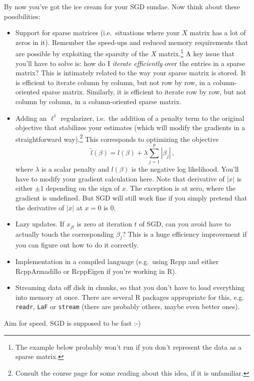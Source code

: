 \documentclass{mynotes}
\begin{document}
By now you've got the ice cream for your SGD sundae.  Now think about these possibilities:
\begin{itemize}
\item Support for sparse matrices (i.e.~situations where your $X$ matrix has a lot of zeros in it).  Remember the speed-ups and reduced memory requirements that are possible by exploiting the sparsity of the $X$ matrix.\footnote{The example below probably won't run if you don't represent the data as a sparse matrix. }  A key issue that you'll have to solve is: how do I \emph{iterate efficiently} over the entries in a sparse matrix?  This is intimately related to the way your sparse matrix is stored.  It is efficient to iterate column by column, but not row by row, in a column-oriented sparse matrix.  Similarly, it is efficient to iterate row by row, but not column by column, in a column-oriented sparse matrix.
\item Adding an $\ell^1$ regularizer, i.e.~the addition of a penalty term to the original objective that stabilizes your estimates (which will modify the gradients in a straightforward way).\footnote{Consult the course page for some reading about this idea, if it is unfamiliar.}  This corresponds to optimizing the objective
$$
\tilde{l}(\beta) = l(\beta) + \lambda \sum_{j=1}^p |\beta_j| \, ,
$$
where $\lambda$ is a scalar penalty and $l(\beta)$ is the negative log likelihood.  You'll have to modify your gradient calculation here.  Note that derivative of $|x|$ is either $\pm 1$ depending on the sign of $x$.  The exception is at zero, where the gradient is undefined.  But SGD will still work fine if you simply pretend that the derivative of $|x|$ at $x=0$ is 0.
\item Lazy updates.  If $x_{jt}$ is zero at iteration $t$ of SGD, can you avoid have to actually touch the corresponding $\beta_j$?  This is a huge efficiency improvement if you can figure out how to do it correctly.
\item Implementation in a compiled language (e.g.~using Rcpp and either RcppArmadillo or RcppEigen if you're working in R).
\item Streaming data off disk in chunks, so that you don't have to load everything into memory at once.  There are several R packages appropriate for this, e.g. \verb|readr|, \verb|LaF| or \verb|stream| (there are probably others, maybe even better ones).
\end{itemize}

Aim for speed.  SGD is supposed to be fast :-)
\end{document}
